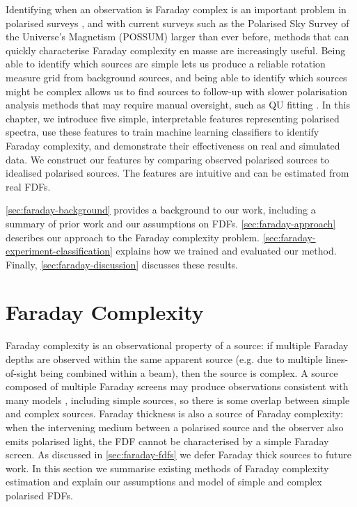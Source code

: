   Identifying when an observation is Faraday complex is an important problem in polarised surveys \citep{sun15comparison}, and with current surveys such as the Polarised Sky Survey of the Universe's Magnetism (POSSUM) larger than ever before, methods that can quickly characterise Faraday complexity en masse are increasingly useful. Being able to identify which sources are simple lets us produce a reliable rotation measure grid from background sources, and being able to identify which sources might be complex allows us to find sources to follow-up with slower polarisation analysis methods that may require manual oversight, such as QU fitting \citep[as seen in e.g.][]{miyashita19qu,osullivan_broad-band_2017}. In this chapter, we introduce five simple, interpretable features representing polarised spectra, use these features to train machine learning classifiers to identify Faraday complexity, and demonstrate their effectiveness on real and simulated data. We construct our features by comparing observed polarised sources to idealised polarised sources. The features are intuitive and can be estimated from real FDFs.

  \autoref{sec:faraday-background} provides a background to our work, including a summary of prior work and our assumptions on FDFs. \autoref{sec:faraday-approach} describes our approach to the Faraday complexity problem. \autoref{sec:faraday-experiment-classification} explains how we trained and evaluated our method. Finally, \autoref{sec:faraday-discussion} discusses these results.

\section{Faraday Complexity}
\label{sec:faraday-background}

    Faraday complexity is an observational property of a source: if multiple Faraday depths are observed within the same apparent source (e.g. due to multiple lines-of-sight being combined within a beam), then the source is complex. A source composed of multiple Faraday screens may produce observations consistent with many models \citep{sun15comparison}, including simple sources, so there is some overlap between simple and complex sources. Faraday thickness is also a source of Faraday complexity: when the intervening medium between a polarised source and the observer also emits polarised light, the FDF cannot be characterised by a simple Faraday screen. As discussed in \autoref{sec:faraday-fdfs} we defer Faraday thick sources to future work. In this section we summarise existing methods of Faraday complexity estimation and explain our assumptions and model of simple and complex polarised FDFs.

